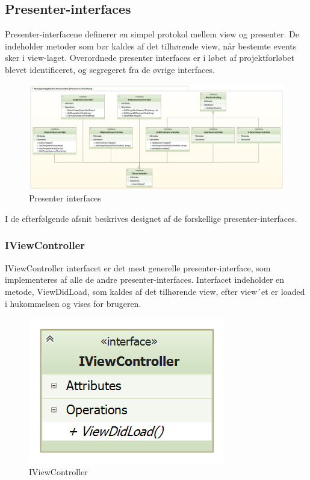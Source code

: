 \subsection{Presenter-interfaces}
Presenter-interfacene definerer en simpel protokol mellem view og presenter. De indeholder metoder som bør kaldes af det tilhørende view, når bestemte events sker i view-laget. Overordnede presenter interfaces er i løbet af projektforløbet blevet identificeret, og segregeret fra de øvrige interfaces.

\begin{figure}
	\centering
	\includegraphics[width=1.0\linewidth]{figs/design/application_presentation_interfaces}
	\caption{Presenter interfaces}
	\label{fig:application_presentation_interfaces}
\end{figure}

I de efterfølgende afsnit beskrives designet af de forskellige presenter-interfaces.

\subsubsection{IViewController}
IViewController interfacet er det mest generelle presenter-interface, som implementeres af alle de andre presenter-interfaces. Interfacet indeholder en metode, ViewDidLoad, som kaldes af det tilhørende view, efter view´et er loaded i hukommelsen og vises for brugeren.

\begin{figure}
	\centering
	\includegraphics[width=0.3\linewidth]{figs/design/application_iviewcontroller}
	\caption{IViewController}
	\label{fig:application_iviewcontroller}
\end{figure}

